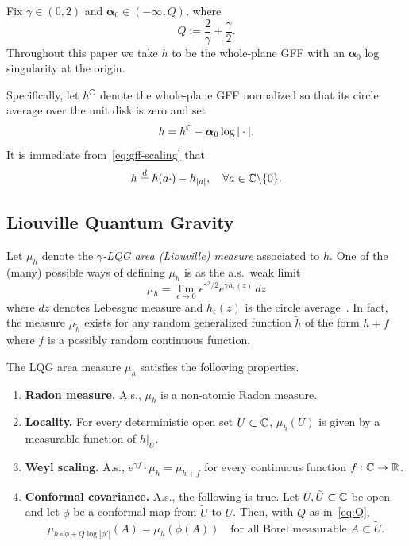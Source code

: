 \documentclass[12pt]{amsart}
\numberwithin{equation}{section}
\begin{document}
	
	Fix $\gamma \in (0,2)$ and $\boldsymbol{\alpha}_0 \in (-\infty, Q)$, where
	\begin{equation} \label{eq:Q}
	Q := \frac{2}{\gamma} + \frac{\gamma}{2}.
	\end{equation}
	Throughout this paper we take $h$ to be the whole-plane GFF with an $\boldsymbol{\alpha}_0$ log singularity at the origin.
	
	
	Specifically, let $h^{\mathbb{C}}$ denote the whole-plane GFF normalized so that its circle average over the unit disk is
	zero and set 
	\begin{equation} \label{eq:gff}
	h = h^{\mathbb{C}} - \boldsymbol{\alpha}_0 \log |\cdot|.
	\end{equation}
	It is immediate from~\eqref{eq:gff-scaling} that
	\begin{equation} \label{eq:h-coordinate-change}
	h \overset{d}{=} h(a\cdot) - h_{|a|}, \quad \forall a \in \mathbb{C} \backslash \{0\}.
	\end{equation}
	
	
	\subsection{Liouville Quantum Gravity} \label{subsec:lqg}
	
	
	
	Let $\mu_h$ denote the {\it $\gamma$-LQG area (Liouville) measure} associated to $h$. One of the (many) possible ways of defining $\mu_h$ is as the a.s.\ weak limit
	\begin{equation} \label{eq:measure-lim}
	\mu_h = \lim_{\epsilon \rightarrow 0} \epsilon^{\gamma^2/2} e^{\gamma h_\epsilon(z)} \,dz
	\end{equation}
	where $dz$ denotes Lebesgue measure and $h_\epsilon(z)$ is the circle average~\cite{duplantier2011liouville, sheffield2016field}.
	In fact, the measure $\mu_{\tilde h}$ exists for any random generalized function $\tilde h$ of the form  $h + f$ where $f$ is a possibly random continuous function. 	
	\begin{fact} \label{fact:lqg-measure}
		The LQG area measure $\mu_h$ satisfies the following properties.
		\begin{enumerate}[label=\Roman*.]
			\item {\bf Radon measure.} A.s., $\mu_h$ is a non-atomic Radon measure.
			\item {\bf Locality.} For every deterministic open set $U \subset \mathbb{C}$,
			$\mu_h(U)$ is given by a measurable function of 
			$h \vert_{U}$.
			\item {\bf Weyl scaling.} A.s., $e^{\gamma f} \cdot \mu_h = \mu_{h + f}$
			for every continuous function $f: \mathbb{C} \to \mathbb{R}$. 
			\item {\bf Conformal covariance.} A.s., the following is true. Let $U , \tilde U \subset \mathbb{C}$ be open and let $\phi$ be a conformal
			map from $\tilde U$ to $U$. Then, with $Q$ as in~\eqref{eq:Q}, 
			\begin{equation} \label{eq:measure-coord}
			\mu_{h \circ \phi + Q \log |\phi'|}(A) = \mu_h(\phi(A)) \quad \mbox{for all Borel measurable $A \subset \tilde U$}.
			\end{equation}
		\end{enumerate}
	\end{fact}
	
\end{document}
